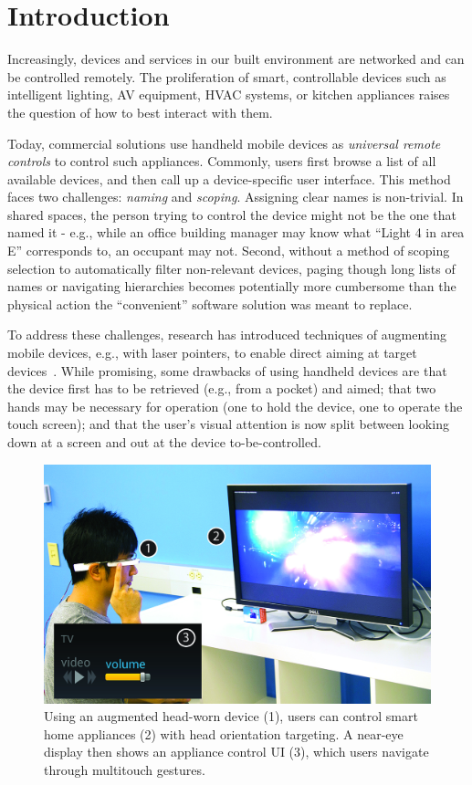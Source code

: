 \section{Introduction}
Increasingly, devices and services in our built environment are networked and can be controlled remotely. The proliferation of smart, controllable devices such as intelligent lighting, AV equipment, HVAC systems, or kitchen appliances raises the question of how to best interact with them. 

Today, commercial solutions use handheld mobile devices as {\em universal remote controls} to control such appliances. Commonly, users first browse a list of all available devices, and then call up a device-specific user interface. This method faces two challenges: {\em naming} and {\em scoping}. Assigning clear names is non-trivial. In shared spaces, the person trying to control the device might not be the one that named it - e.g., while an office building manager may know what ``Light 4 in area E'' corresponds to, an occupant may not. Second, without a method of scoping selection to automatically filter non-relevant devices, paging though long lists of names or navigating hierarchies becomes potentially more cumbersome than the physical action the ``convenient'' software solution was meant to replace.

To address these challenges, research has introduced techniques of augmenting mobile devices, e.g., with laser pointers, to enable direct aiming at target devices~\cite{beigl_point_1999,patel_2-way_2003}. While promising, some drawbacks of using handheld devices are that the device first has to be retrieved (e.g., from a pocket) and aimed; that two hands may be necessary for operation (one to hold the device, one to operate the touch screen); and that the user's visual attention is now split between looking down at a screen and out at the device to-be-controlled. 

\begin{figure}[t]
\centering
\includegraphics[width=1.0\columnwidth]{figures/teaser.jpg}
\caption{Using an augmented head-worn device (1), users can control smart home appliances (2) with head orientation targeting. A near-eye display then shows an appliance control UI (3), which users navigate through multitouch gestures.}
\label{fig:teaser}
\end{figure}


